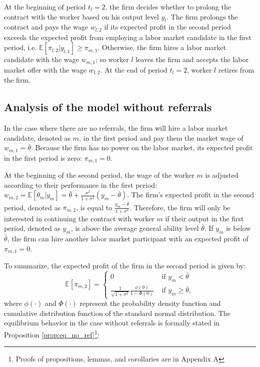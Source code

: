 \documentclass[12pt]{article}
\begin{document}
At the beginning of period $t_l =2$, the firm decides whether to prolong the contract with the worker based on his output level $y_l$. The firm prolongs the contract and pays the wage $w_{l,2}$ if its expected profit in the second period exceeds the expected profit from employing a labor market candidate in the first period, i.e. $\mathbb{E}[\pi_{l,2}|y_{l,1}] \geq \pi_{m,1}$. Otherwise, the firm hires a labor market candidate with the wage $w_{m,1}$; so worker $l$ leaves the firm and accepts the labor market offer with the wage $w_{l,2}$. At the end of period $t_l = 2$, worker $l$ retires from the firm.

\subsection{Analysis of the model without referrals}

In the case where there are no referrals, the firm will hire a labor market candidate, denoted as $m$, in the first period and pay them the market wage of $w_{m,1} = \bar{\theta}$. Because the firm has no power on the labor market, its expected profit in the first period is zero: $\pi_{m,1} = 0$.

At the beginning of the second period, the wage of the worker $m$ is adjusted according to their performance in the first period: $w_{m,2} = \mathbb{E}[\theta_m|y_m] = \bar{\theta} + \frac{\sigma^2}{1+\sigma^2}(y_m-\bar{\theta})$. The firm's expected profit in the second period, denoted as $\pi_{m,2}$, is equal to $\frac{y_m-\bar{\theta}}{1+\sigma^2}$. Therefore, the firm will only be interested in continuing the contract with worker $m$ if their output in the first period, denoted as $y_m$, is above the average general ability level $\bar{\theta}$. If $y_m$ is below $\bar{\theta}$, the firm can hire another labor market participant with an expected profit of $\pi_{m,1}=0$.

To summarize, the expected profit of the firm in the second period is given by:
\begin{equation}
    \mathbb{E}[\pi_{m,2}]= 
    \begin{cases}
        0 & \text{ if } y_m < \bar{\theta}\\
        \frac{1}{\sqrt{1 + \sigma^2}}\frac{\phi(0)}{1-\Phi(0)} & \text{ if } y_m \geq \bar{\theta},
    \end{cases}
\end{equation}
where $\phi(\cdot)$ and $\Phi(\cdot)$ represent the probability density function and cumulative distribution function of the standard normal distribution. The equilibrium behavior in the case without referrals is formally stated in Proposition \ref{prop:eq_no_ref}\footnote{Proofs of propositions, lemmas, and corollaries are in Appendix A}:
\end{document}
